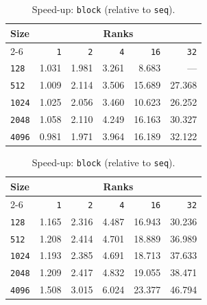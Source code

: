 \documentclass[11pt]{article}
\begin{document}
\begin{table}[H]
    \centering
    \begin{minipage}{0.48\textwidth}
        \centering
        \begin{tabular}{|l|r|r|r|r|r|} \hline
            \cellcolor{blue!10}\textbf{Size} & \multicolumn{5}{c|}{\cellcolor{blue!10}\textbf{Ranks}} 
            \\ \cline{2-6}
            \cellcolor{blue!10} & \cellcolor{blue!20}\texttt{1} & \cellcolor{blue!20}\texttt{2} & \cellcolor{blue!20}\texttt{4} & \cellcolor{blue!20}\texttt{16} & \cellcolor{blue!20}\texttt{32} \\ \hline
            \texttt{128}  & \cellcolor{red!20}1.031  & 1.981  & 3.261  & \cellcolor{green!20}8.683  & ---     \\ \hline
            \texttt{512}  & \cellcolor{red!20}1.009  & 2.114  & 3.506  & 15.689 & \cellcolor{green!20}27.368 \\ \hline
            \texttt{1024} & \cellcolor{red!20}1.025  & 2.056  & 3.460  & 10.623 & \cellcolor{green!20}26.252 \\ \hline
            \texttt{2048} & \cellcolor{red!20}1.058  & 2.110  & 4.249  & 16.163 & \cellcolor{green!20}30.327 \\ \hline
            \texttt{4096} & \cellcolor{red!20}0.981  & 1.971  & 3.964  & 16.189 & \cellcolor{green!20}32.122 \\ \hline
        \end{tabular}
        \caption{Speed-up: \texttt{row} (relative to \texttt{seq}).}
    \end{minipage}
    \hfill
    \begin{minipage}{0.48\textwidth}
        \centering
        \begin{tabular}{|l|r|r|r|r|r|} \hline
            \cellcolor{blue!10}\textbf{Size} & \multicolumn{5}{c|}{\cellcolor{blue!10}\textbf{Ranks}} 
            \\ \cline{2-6}
            \cellcolor{blue!10} & \cellcolor{blue!20}\texttt{1} & \cellcolor{blue!20}\texttt{2} & \cellcolor{blue!20}\texttt{4} & \cellcolor{blue!20}\texttt{16} & \cellcolor{blue!20}\texttt{32} \\ \hline
            \texttt{128}  & \cellcolor{red!20}1.165  & 2.316  & 4.487  & 16.943 & \cellcolor{green!20}30.236 \\ \hline
            \texttt{512}  & \cellcolor{red!20}1.208  & 2.414  & 4.701  & 18.889 & \cellcolor{green!20}36.989 \\ \hline
            \texttt{1024} & \cellcolor{red!20}1.193  & 2.385  & 4.691  & 18.713 & \cellcolor{green!20}37.633 \\ \hline
            \texttt{2048} & \cellcolor{red!20}1.209  & 2.417  & 4.832  & 19.055 & \cellcolor{green!20}38.471 \\ \hline
            \texttt{4096} & \cellcolor{red!20}1.508  & 3.015  & 6.024  & 23.377 & \cellcolor{green!20}46.794 \\ \hline
        \end{tabular}
        \caption{Speed-up: \texttt{block} (relative to \texttt{seq}).}
    \end{minipage}
\end{table}
\end{document}
